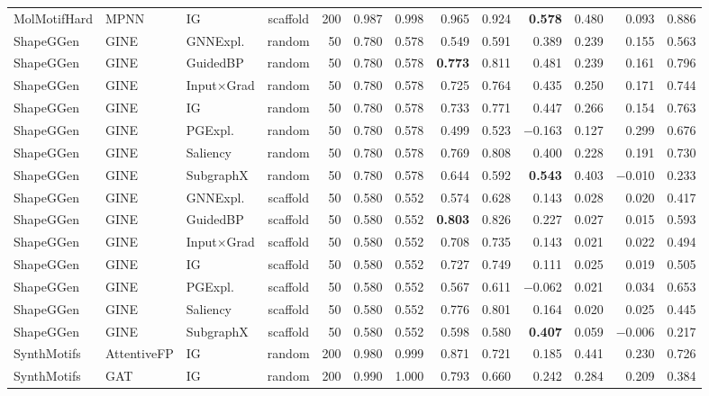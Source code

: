 \begin{table}[t]
{\begin{tabular}{lllcrrrrrrrrr}
MolMotifHard & MPNN & IG & scaffold & 200 & 0.987 & 0.998 & 0.965 & 0.924 & \textbf{0.578} & 0.480 & 0.093 & 0.886 \\
\addlinespace[2pt]
ShapeGGen & GINE & GNNExpl. & random & 50 & 0.780 & 0.578 & 0.549 & 0.591 & 0.389 & 0.239 & 0.155 & 0.563 \\
ShapeGGen & GINE & GuidedBP & random & 50 & 0.780 & 0.578 & \textbf{0.773} & 0.811 & 0.481 & 0.239 & 0.161 & 0.796 \\
ShapeGGen & GINE & Input$\times$Grad & random & 50 & 0.780 & 0.578 & 0.725 & 0.764 & 0.435 & 0.250 & 0.171 & 0.744 \\
ShapeGGen & GINE & IG & random & 50 & 0.780 & 0.578 & 0.733 & 0.771 & 0.447 & 0.266 & 0.154 & 0.763 \\
ShapeGGen & GINE & PGExpl. & random & 50 & 0.780 & 0.578 & 0.499 & 0.523 & $-$0.163 & 0.127 & 0.299 & 0.676 \\
ShapeGGen & GINE & Saliency & random & 50 & 0.780 & 0.578 & 0.769 & 0.808 & 0.400 & 0.228 & 0.191 & 0.730 \\
ShapeGGen & GINE & SubgraphX & random & 50 & 0.780 & 0.578 & 0.644 & 0.592 & \textbf{0.543} & 0.403 & $-$0.010 & 0.233 \\
\addlinespace[2pt]
ShapeGGen & GINE & GNNExpl. & scaffold & 50 & 0.580 & 0.552 & 0.574 & 0.628 & 0.143 & 0.028 & 0.020 & 0.417 \\
ShapeGGen & GINE & GuidedBP & scaffold & 50 & 0.580 & 0.552 & \textbf{0.803} & 0.826 & 0.227 & 0.027 & 0.015 & 0.593 \\
ShapeGGen & GINE & Input$\times$Grad & scaffold & 50 & 0.580 & 0.552 & 0.708 & 0.735 & 0.143 & 0.021 & 0.022 & 0.494 \\
ShapeGGen & GINE & IG & scaffold & 50 & 0.580 & 0.552 & 0.727 & 0.749 & 0.111 & 0.025 & 0.019 & 0.505 \\
ShapeGGen & GINE & PGExpl. & scaffold & 50 & 0.580 & 0.552 & 0.567 & 0.611 & $-$0.062 & 0.021 & 0.034 & 0.653 \\
ShapeGGen & GINE & Saliency & scaffold & 50 & 0.580 & 0.552 & 0.776 & 0.801 & 0.164 & 0.020 & 0.025 & 0.445 \\
ShapeGGen & GINE & SubgraphX & scaffold & 50 & 0.580 & 0.552 & 0.598 & 0.580 & \textbf{0.407} & 0.059 & $-$0.006 & 0.217 \\
\addlinespace[2pt]
SynthMotifs & AttentiveFP & IG & random & 200 & 0.980 & 0.999 & 0.871 & 0.721 & 0.185 & 0.441 & 0.230 & 0.726 \\
SynthMotifs & GAT & IG & random & 200 & 0.990 & 1.000 & 0.793 & 0.660 & 0.242 & 0.284 & 0.209 & 0.384 \\

\end{tabular}}
\end{table}
